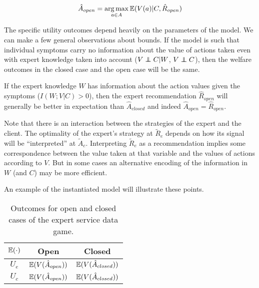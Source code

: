 \documentclass[../thesis.tex]{subfiles}
\begin{document}
$$\hat{A}_{open} = \operatorname*{arg\,max}_{a \in A} \mathbb{E}(V(a) \vert C, \hat{R}_{open})$$

The specific utility outcomes depend heavily on the parameters of
the model.
We can make a few general observations about bounds.
If the model is such that individual symptoms carry no
information about the value of actions taken even with expert
knowledge taken into account ($V \independent C \vert W$,
$V \independent C$),
then the welfare outcomes in the closed case and the open case will
be the same.

If the expert knowledge $W$ has information
about the action values given the symptoms ($I(W;V \vert C) > 0$),
then the expert recommendation $\hat{R}_{open}$ will generally be better
in expectation than $\hat{A}_{closed}$ and indeed
$\hat{A}_{open} = \hat{R}_{open}$.

Note that there is an interaction between the strategies of the
expert and the client.
The optimality of the expert's strategy at $\tilde{R}_e$ depends
on how its signal will be ``interpreted'' at $\tilde{A}_c$.
Interpreting $\tilde{R}_e$ as a recommendation implies some
correspondence between the value taken at that variable and
the values of actions according to $V$.
But in some cases an alternative encoding of the information
in $W$ (and $C$) may be more efficient.

An example of the instantiated model will illustrate these points.

\begin{table}
\begin{center}
\begin{tabular}{ |c|c|c| } 
 \hline
  $\mathbb{E}(\cdot)$ & Open  & Closed \\
 \hline
 $U_e$ & $\mathbb{E}(V(\hat{A}_{open}))$ & $\mathbb{E}(V(\hat{A}_{closed}))$ \\ 
 $U_c$ & $\mathbb{E}(V(\hat{A}_{open}))$ & $\mathbb{E}(V(\hat{A}_{closed}))$  \\
 \hline
\end{tabular}
\caption{Outcomes for open and closed cases of the expert service data game.}
\end{center}
\end{table}
\end{document}
